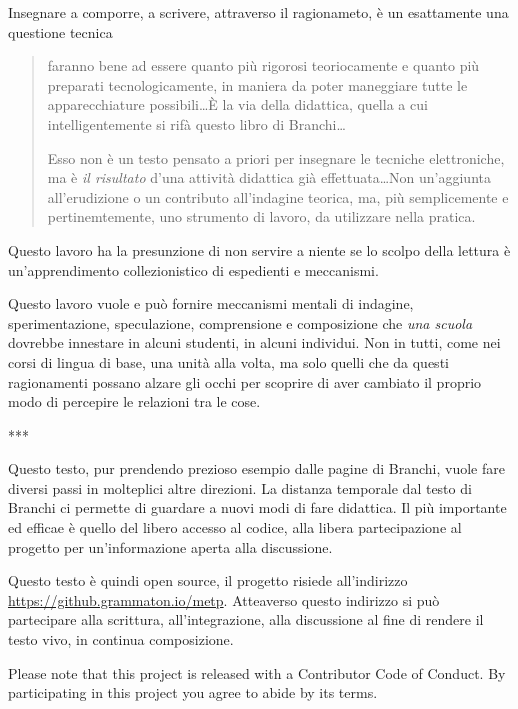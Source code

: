Insegnare a comporre, a scrivere, attraverso il ragionameto, è un esattamente
una questione tecnica

\begin{quote}
  faranno bene ad essere quanto più rigorosi teoriocamente e quanto più
  preparati tecnologicamente, in maniera da poter maneggiare tutte le
  apparecchiature possibili\ldots È la via della didattica, quella a cui
  intelligentemente si rifà questo libro di Branchi\ldots

  Esso non è un testo pensato a priori per insegnare le tecniche elettroniche,
  ma è \emph{il risultato} d'una attività didattica già effettuata\ldots Non
  un'aggiunta all'erudizione o un contributo all'indagine teorica, ma, più
  semplicemente e pertinemtemente, uno strumento di lavoro, da utilizzare nella
  pratica.
\end{quote}

Questo lavoro ha la presunzione di non servire a niente se lo scolpo della
lettura è un'apprendimento collezionistico di espedienti e meccanismi.

Questo lavoro vuole e può fornire meccanismi mentali di indagine,
sperimentazione, speculazione, comprensione e composizione che \emph{una scuola}
dovrebbe innestare in alcuni studenti, in alcuni individui. Non in tutti, come nei
corsi di lingua di base, una unità alla volta, ma solo quelli che da questi
ragionamenti possano alzare gli occhi per scoprire di aver
cambiato il proprio modo di percepire le relazioni tra le cose.

***

Questo testo, pur prendendo prezioso esempio dalle pagine di Branchi, vuole fare
diversi passi in molteplici altre direzioni. La distanza temporale dal testo di
Branchi ci permette di guardare a nuovi modi di fare didattica. Il più
importante ed efficae è quello del libero accesso al codice, alla libera
partecipazione al progetto per un'informazione aperta alla discussione.

Questo testo è quindi open source, il progetto risiede all'indirizzo
\url{https://github.grammaton.io/metp}. Atteaverso questo indirizzo si può
partecipare alla scrittura, all'integrazione, alla discussione al fine di
rendere il testo vivo, in continua composizione.

Please note that this project is released with a Contributor Code of Conduct.
By participating in this project you agree to abide by its terms.


\clearpage
